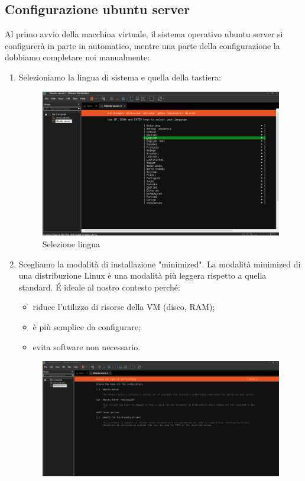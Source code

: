 \documentclass[12pt,a4paper,twoside]{book}
\begin{document}
\subsection{Configurazione ubuntu server}
Al primo avvio della macchina virtuale, il sistema operativo ubuntu server si configurerà in parte in automatico, mentre una parte della configurazione la dobbiamo completare noi manualmente:
\begin{enumerate}
    \item Selezioniamo la lingua di sistema e quella della tastiera:
    \begin{figure}[H]
        \centering
        \includegraphics[width=.7\linewidth]{tesi/img/lingua_ubuntu.png}
        \caption{Selezione lingua}
        \label{fig:lingua_ubuntu}
    \end{figure}
    \item Scegliamo la modalità di installazione "minimized". La modalità minimized di una distribuzione Linux è una modalità più leggera rispetto a quella standard. \'E ideale al nostro contesto perché:
    \begin{itemize}
        \item riduce l'utilizzo di risorse della \ac{VM} (disco, RAM);
        \item è più semplice da configurare;
        \item evita software non necessario.
    \end{itemize}
      \begin{figure}[H]
        \centering
        \includegraphics[width=.7\linewidth]{tesi/img/installazione_minimized.png}

\end{figure}
\end{enumerate}
\end{document}
